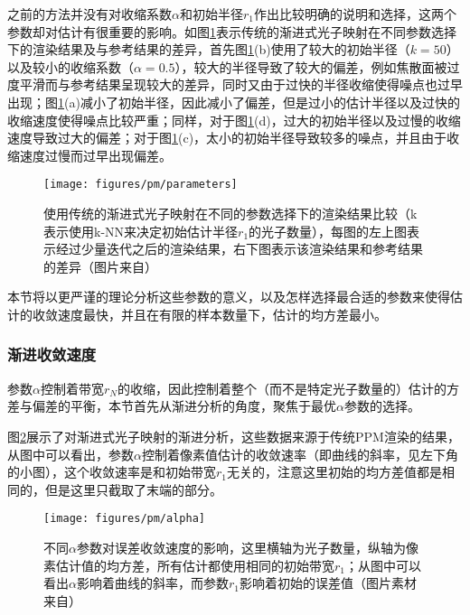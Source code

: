 之前的方法并没有对收缩系数$\alpha$和初始半径$r_1$作出比较明确的说明和选择，这两个参数却对估计有很重要的影响。如图\ref{f:pm-parameters}表示传统的渐进式光子映射在不同参数选择下的渲染结果及与参考结果的差异，首先图\ref{f:pm-parameters}(b)使用了较大的初始半径（$k=50$）以及较小的收缩系数（$\alpha=0.5$），较大的半径导致了较大的偏差，例如焦散面被过度平滑而与参考结果呈现较大的差异，同时又由于过快的半径收缩使得噪点也过早出现；图\ref{f:pm-parameters}(a)减小了初始半径，因此减小了偏差，但是过小的估计半径以及过快的收缩速度使得噪点比较严重；同样，对于图\ref{f:pm-parameters}(d)，过大的初始半径以及过慢的收缩速度导致过大的偏差；对于图\ref{f:pm-parameters}(c)，太小的初始半径导致较多的噪点，并且由于收缩速度过慢而过早出现偏差。

\begin{figure}
\begin{fullwidth}
	\texttt{[image: figures/pm/parameters]}
	\caption{使用传统的渐进式光子映射在不同的参数选择下的渲染结果比较（k表示使用k-NN来决定初始估计半径$r_1$的光子数量），每图的左上图表示经过少量迭代之后的渲染结果，右下图表示该渲染结果和参考结果的差异（图片来自\cite{a:AdaptiveProgressivePhotonMapping}）}	
	\label{f:pm-parameters}
\end{fullwidth}
\end{figure}

本节将以更严谨的理论分析这些参数的意义，以及怎样选择最合适的参数来使得估计的收敛速度最快，并且在有限的样本数量下，估计的均方差最小。





\subsubsection{渐进收敛速度}
参数$\alpha$控制着带宽$r_N$的收缩，因此控制着整个（而不是特定光子数量的）估计的方差与偏差的平衡，本节首先从渐进分析的角度，聚焦于最优$\alpha$参数的选择。

图\ref{f:pm-alpha}展示了对渐进式光子映射的渐进分析，这些数据来源于传统PPM渲染的结果，从图中可以看出，参数$\alpha$控制着像素值估计的收敛速率（即曲线的斜率，见左下角的小图），这个收敛速率是和初始带宽$r_1$无关的，注意这里初始的均方差值都是相同的，但是这里只截取了末端的部分。

\begin{figure}
	\texttt{[image: figures/pm/alpha]}
	\caption{不同$\alpha$参数对误差收敛速度的影响，这里横轴为光子数量，纵轴为像素估计值的均方差，所有估计都使用相同的初始带宽$r_1$；从图中可以看出$\alpha$影响着曲线的斜率，而参数$r_1$影响着初始的误差值（图片素材来自\cite{a:AdaptiveProgressivePhotonMapping}）}
	\label{f:pm-alpha}
\end{figure}

